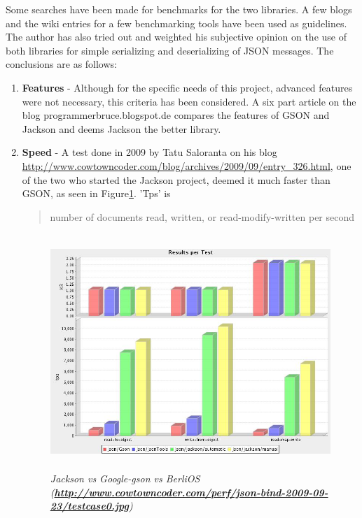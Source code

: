 \documentclass{article}
\begin{document}
Some searches have been made for benchmarks for the two libraries. A few
blogs\cite{jacksonvsgson} \cite{jacksonvsgson2} \cite{jacksonvsgson4} and the
wiki entries for a few benchmarking tools\cite{jacksonvsgson3} \cite{jacksonvsgson5}
have been used as guidelines. The author has also tried out and weighted his
subjective opinion on the use of both libraries for simple serializing and
deserializing of JSON messages. The conclusions are as follows:
\begin{enumerate}
  \item \textbf{Features} - Although for the specific needs of this project,
  advanced features were not necessary, this criteria has been considered. A
  six part article on the blog programmerbruce.blogspot.de compares the features
  of GSON and Jackson and deems Jackson the better library.
  
  \item \textbf{Speed} - A test done in 2009 by Tatu Saloranta on his blog
  \url{http://www.cowtowncoder.com/blog/archives/2009/09/entry_326.html}, one of
  the two who started the Jackson project, deemed it much faster than GSON, as
  seen in Figure\ref{fig:jacksonvsgson1}. 'Tps' is \begin{quote}number of
  documents read, written, or read-modify-written per second\end{quote}
   
  \begin{figure}
  \includegraphics[height=3.5in,width=6.23in]{./images/benchmarks/testcase0.jpg}
  \caption{\small \sl Jackson vs Google-gson vs BerliOS
  (\textbf{\url{http://www.cowtowncoder.com/perf/json-bind-2009-09-23/testcase0.jpg}})}
  \label{fig:jacksonvsgson1}
  \end{figure}
  

\end{enumerate}
\end{document}
